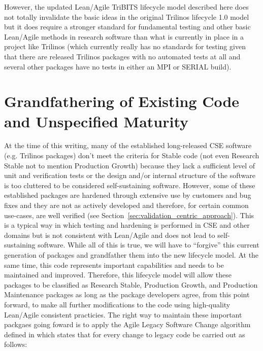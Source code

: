 \documentclass[11pt]{SANDreport}
\begin{document}
However, the updated Lean/Agile TriBITS lifecycle model described here
does not totally invalidate the basic ideas in the original Trilinos
lifecycle 1.0 model but it does require a stronger standard for
fundamental testing and other basic Lean/Agile methods in research
software than what is currently in place in a project like Trilinos
(which currently really has no standards for testing given that there
are released Trilinos packages with no automated tests at all and
several other packages have no tests in either an MPI or SERIAL
build).


%
{}\section{Grandfathering of Existing Code and Unspecified Maturity}
\label{sec:grandfathering}
%

At the time of this writing, many of the established long-released CSE
software (e.g. Trilinos packages) don't meet the criteria for Stable
code (not even Research Stable not to mention Production Growth)
because they lack a sufficient level of unit and verification tests or
the design and/or internal structure of the software is too cluttered
to be considered self-sustaining software.  However, some of these
established packages are hardened through extensive use by customers
and bug fixes and they are not as actively developed and therefore,
for certain common use-cases, are well verified (see
Section~\ref{sec:validation_centric_approach}).  This is a typical
way in which testing and hardening is performed in CSE and other
domains but is not consistent with Lean/Agile and does not lead to
self-sustaining software.  While all of this is true, we will have to
``forgive'' this current generation of packages and grandfather them
into the new lifecycle model.  At the same time, this code represents
important capabilities and needs to be maintained and improved.
Therefore, this lifecycle model will allow these packages to be
classified as Research Stable, Production Growth, and Production
Maintenance packages as long as the package developers agree, from
this point forward, to make all further modifications to the code
using high-quality Lean/Agile consistent practicies.  The right way to
maintain these important packgaes going foward is to apply the Agile
Legacy Software Change algorithm defined in
{}\cite{WorkingEffectivelyWithLegacyCode05} which states that for
every change to legacy code be carried out as follows:
\end{document}
